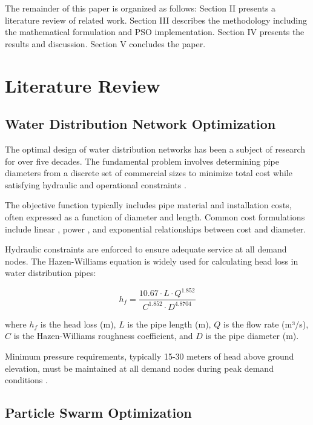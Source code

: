 \documentclass[conference]{IEEEtran}
\begin{document}
The remainder of this paper is organized as follows: Section II presents a literature review of related work. Section III describes the methodology including the mathematical formulation and PSO implementation. Section IV presents the results and discussion. Section V concludes the paper.

\section{Literature Review}

\subsection{Water Distribution Network Optimization}

The optimal design of water distribution networks has been a subject of research for over five decades. The fundamental problem involves determining pipe diameters from a discrete set of commercial sizes to minimize total cost while satisfying hydraulic and operational constraints \cite{alperovits1977heuristic}.

The objective function typically includes pipe material and installation costs, often expressed as a function of diameter and length. Common cost formulations include linear \cite{chesani1978optimal}, power \cite{lansey1989optimal}, and exponential \cite{deb1997optimization} relationships between cost and diameter.

Hydraulic constraints are enforced to ensure adequate service at all demand nodes. The Hazen-Williams equation is widely used for calculating head loss in water distribution pipes:

\begin{equation}
h_f = \frac{10.67 \cdot L \cdot Q^{1.852}}{C^{1.852} \cdot D^{4.8704}}
\end{equation}

where $h_f$ is the head loss (m), $L$ is the pipe length (m), $Q$ is the flow rate (m³/s), $C$ is the Hazen-Williams roughness coefficient, and $D$ is the pipe diameter (m).

Minimum pressure requirements, typically 15-30 meters of head above ground elevation, must be maintained at all demand nodes during peak demand conditions \cite{mays2000water}.

\subsection{Particle Swarm Optimization}
\end{document}
